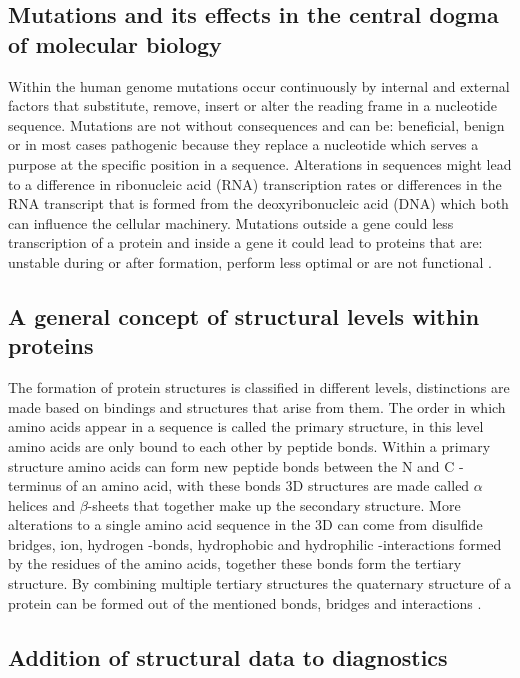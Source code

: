 \subsection{Mutations and its effects in the central dogma of molecular biology}
Within the human genome mutations occur continuously by internal and external factors that substitute, remove, insert or alter the reading frame in a nucleotide sequence. Mutations are not without consequences and can be: beneficial, benign or in most cases pathogenic because they replace a nucleotide which serves a purpose at the specific position in a sequence. Alterations in sequences might lead to a difference in ribonucleic acid (RNA) transcription rates or differences in the RNA transcript that is formed from the deoxyribonucleic acid (DNA) which both can influence the cellular machinery. Mutations outside a gene could less transcription of a protein and inside a gene it could lead to proteins that are: unstable during or after formation, perform less optimal or are not functional \cite{}.

\subsection{A general concept of structural levels within proteins}
The formation of protein structures is classified in different levels, distinctions are made based on bindings and structures that arise from them. 
The order in which amino acids appear in a sequence is called the primary structure, in this level amino acids are only bound to each other by peptide bonds. 
Within a primary structure amino acids can form new peptide bonds between the N and C -terminus of an amino acid, with these bonds 3D structures are made called $\alpha$ helices and $\beta$-sheets that together make up the secondary structure.
More alterations to a single amino acid sequence in the 3D can come from disulfide bridges, ion, hydrogen -bonds, hydrophobic and hydrophilic -interactions formed by the residues of the amino acids, together these bonds form the tertiary structure.
By combining multiple tertiary structures the quaternary structure of a protein can be formed out of the mentioned bonds, bridges and interactions \cite{}.


\subsection{Addition of structural data to diagnostics}

